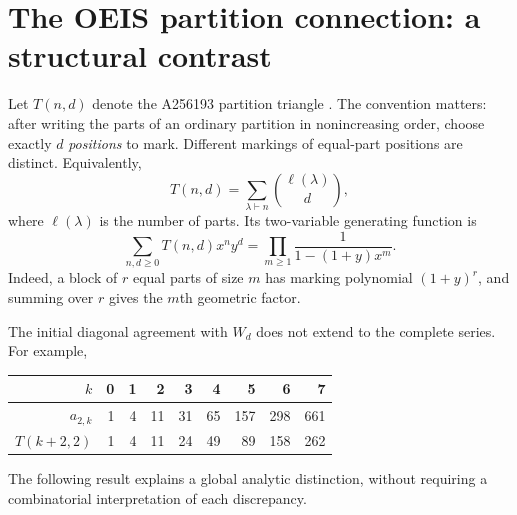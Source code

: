 \documentclass[11pt,letterpaper]{article}
\numberwithin{equation}{section}
\theoremstyle{definition}
\theoremstyle{remark}
\begin{document}
\section{The OEIS partition connection: a structural contrast}\label{sec:partitions}
Let $T(n,d)$ denote the A256193 partition triangle \cite{OEIS}.
The convention matters: after writing the parts of an ordinary partition
in nonincreasing order, choose exactly $d$ \emph{positions} to mark.
Different markings of equal-part positions are distinct. Equivalently,
\begin{equation}\label{eq:Tdefinition}
 T(n,d)=\sum_{\lambda\vdash n}\binom{\ell(\lambda)}{d},
\end{equation}
where $\ell(\lambda)$ is the number of parts. Its two-variable generating
function is
\begin{equation}\label{eq:Tgf}
 \sum_{n,d\ge0}T(n,d)x^ny^d
       =\prod_{m\ge1}\frac{1}{1-(1+y)x^m}.
\end{equation}
Indeed, a block of $r$ equal parts of size $m$ has marking polynomial
$(1+y)^r$, and summing over $r$ gives the $m$th geometric factor.

The initial diagonal agreement with $W_d$ does not extend to the
complete series. For example,
\begin{center}
\begin{tabular}{r|rrrrrrrr}
\toprule
$k$ & 0&1&2&3&4&5&6&7\\
\midrule
$a_{2,k}$ &1&4&11&31&65&157&298&661\\
$T(k+2,2)$&1&4&11&24&49&89&158&262\\
\bottomrule
\end{tabular}
\end{center}
The following result explains a global analytic distinction, without
requiring a combinatorial interpretation of each discrepancy.
\end{document}

